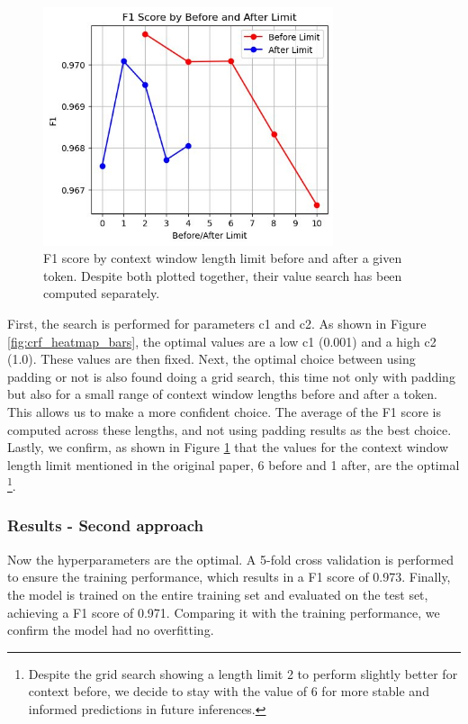 \documentclass{article}
\begin{document}
\begin{figure}[!t]
	\centering
	\includegraphics[height=7cm]{images/crf_lines.jpg}
	\captionsetup{width=0.9\textwidth}
	\caption{F1 score by context window length limit before and after a given token. Despite both plotted
	together, their value search has been computed separately.}
	\label{fig:crf_lines}
\end{figure}

First, the search is performed for parameters c1 and c2. As shown in Figure \ref{fig:crf_heatmap_bars},
the optimal values are a
low c1 (0.001) and a high c2 (1.0). These values are then fixed. Next, the optimal choice between using
padding or not is also found doing a grid search, this time not only with padding but also for a small
range of context window lengths before and after a token. This allows us to make a more confident choice.
The average of the F1 score is computed across these lengths, and not using padding results as the best
choice. Lastly, we confirm, as shown in Figure \ref{fig:crf_lines} that the values for the context
window length limit mentioned in the original
paper, 6 before and 1 after, are the optimal \footnote{Despite the grid search showing a length limit 2
to perform slightly better for context before, we decide to stay with the value of 6 for more stable and
informed predictions in future inferences.}.

\subsubsection*{Results - Second approach}
Now the hyperparameters are the optimal. A 5-fold cross validation is performed to ensure the training
performance, which results in a F1 score of 0.973. Finally, the model is trained on the entire training
set and evaluated on the test set, achieving a F1 score of 0.971. Comparing it with the training performance,
we confirm the model had no overfitting.
\end{document}
